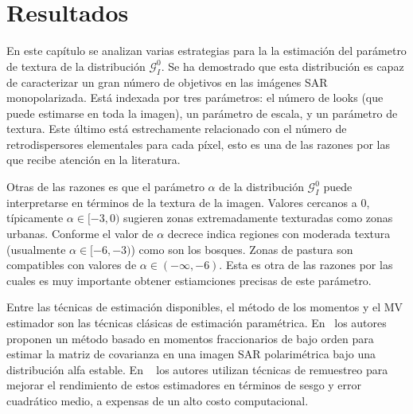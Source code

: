 
\chapter{Resultados}


En este capítulo se analizan varias estrategias para la la estimación del parámetro de textura de la distribución $\mathcal{G}_I^0$.
Se ha demostrado que esta distribución es capaz de caracterizar un gran número de objetivos en las imágenes SAR monopolarizada. Está indexada por
tres parámetros: el número de looks (que puede estimarse en toda la imagen), un parámetro de escala, y un parámetro de textura. Este último está estrechamente relacionado con el número
de retrodispersores elementales para cada píxel, esto es una de las razones por las que recibe atención en la literatura. 

Otras de las razones es que el parámetro $\alpha$ de la distribución $\mathcal{G}_I^0$ puede interpretarse en términos de la textura de la imagen. Valores cercanos a $0$, típicamente $\alpha \in [-3,0)$ sugieren zonas extremadamente texturadas como zonas urbanas. Conforme el valor de $\alpha$ decrece indica regiones con moderada textura (usualmente $\alpha \in [-6,-3)$) como son los bosques. Zonas de pastura son compatibles con valores de $\alpha \in (-\infty,-6)$. Esta es otra de las razones por las cuales es muy importante obtener estiamciones precisas de este parámetro.

Entre las técnicas de estimación disponibles, el método de los momentos y el MV estimador son las técnicas clásicas de estimación paramétrica. En~\cite{Bian2013} los autores proponen un método basado en
momentos fraccionarios de bajo orden para estimar la matriz de covarianza en una imagen SAR polarimétrica bajo una distribución alfa estable. En ~\cite{VasconcellosFrerySilva:CompStat,CribariFrerySilva:CSDA} los autores utilizan técnicas de remuestreo para mejorar el rendimiento de estos estimadores en términos de sesgo y error cuadrático medio, a expensas de un alto costo computacional.


